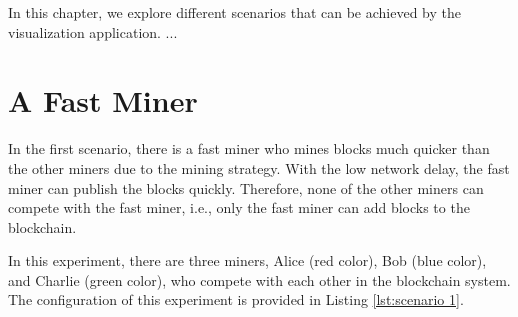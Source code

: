 In this chapter, we explore different scenarios that can be achieved by the visualization application. ...

\section{A Fast Miner}

In the first scenario, there is a fast miner who mines blocks much quicker than the other miners due to the mining strategy. With the low network delay, the fast miner can publish the blocks quickly. Therefore, none of the other miners can compete with the fast miner, i.e., only the fast miner can add blocks to the blockchain.

In this experiment, there are three miners, Alice (red color), Bob (blue color), and Charlie (green color), who compete with each other in the blockchain system. The configuration of this experiment is provided in Listing \ref{lst:scenario 1}.

